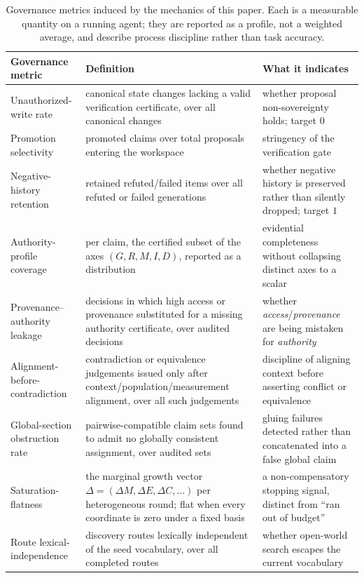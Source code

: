 \begin{table}[t]
\footnotesize
\begin{tabular}{@{}p{} p{} p{}@{}}
\hline
\textbf{Governance metric} & \textbf{Definition} & \textbf{What it indicates} \\
\hline
Unauthorized-write rate & canonical state changes lacking a valid verification certificate, over all canonical changes & whether proposal non-sovereignty holds; target $0$ \\
Promotion selectivity & promoted claims over total proposals entering the workspace & stringency of the verification gate \\
Negative-history retention & retained refuted/failed items over all refuted or failed generations & whether negative history is preserved rather than silently dropped; target $1$ \\
Authority-profile coverage & per claim, the certified subset of the axes $(G,R,M,I,D)$, reported as a distribution & evidential completeness without collapsing distinct axes to a scalar \\
Provenance--authority leakage & decisions in which high access or provenance substituted for a missing authority certificate, over audited decisions & whether \emph{access}/\emph{provenance} are being mistaken for \emph{authority} \\
Alignment-before-contradiction & contradiction or equivalence judgements issued only after context/population/measurement alignment, over all such judgements & discipline of aligning context before asserting conflict or equivalence \\
Global-section obstruction rate & pairwise-compatible claim sets found to admit no globally consistent assignment, over audited sets & gluing failures detected rather than concatenated into a false global claim \\
Saturation-flatness & the marginal growth vector $\Delta=(\Delta M,\Delta E,\Delta C,\dots)$ per heterogeneous round; flat when every coordinate is zero under a fixed basis & a non-compensatory stopping signal, distinct from ``ran out of budget'' \\
Route lexical-independence & discovery routes lexically independent of the seed vocabulary, over all completed routes & whether open-world search escapes the current vocabulary \\
\hline
\end{tabular}
\caption{Governance metrics induced by the mechanics of this paper. Each is a measurable quantity on a running agent; they are reported as a profile, not a weighted average, and describe process discipline rather than task accuracy.}
\label{tab:metrics}
\end{table}
